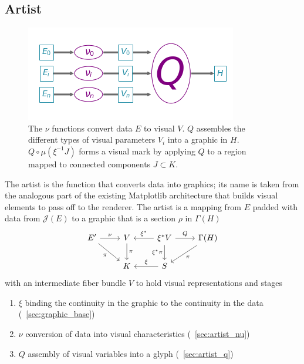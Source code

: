 \documentclass[../main.tex]{subfiles}
\begin{document}
\subsection{Artist}
\label{sec:artist}
\begin{figure}[H]
    \includegraphics[width=\textwidth]{figures/math/path_of_q}

    \caption{The $\nu$ functions convert data $E$ to visual $V$. $Q$ assembles the different types of visual parameters $V_{i}$ into a graphic in $H$. $Q\circ\mu(\xi^{-1}J)$ forms a visual mark by applying $Q$ to a region mapped to connected components $J \subset K$. } 
    \label{fig:artist_q}
\end{figure}

The artist is the function that converts data into graphics; its name is taken from the analogous part of the existing Matplotlib architecture that builds visual elements to pass off to the renderer. The artist is a mapping from $E$ padded with data from $\mathcal{J}(E)$ to a graphic that is a section $\rho$ in  $\Gamma(H)$
\begin{equation}
    \label{eq:artist_diagram}
    \begin{tikzcd}
        E' \arrow[r, "\nu"] \arrow[rd, "\pi"'] & V \arrow[d, "\pi"] & \xi^*V \arrow[r, "Q"] \arrow[d, "\xi^*\pi"'] \arrow[l, "\xi^*"'] & \Gamma(H) \arrow[ld, "\pi"] \\
                                              & K                  & S \arrow[l, "\xi"']                                              &                    
        \end{tikzcd}
\end{equation}
with an intermediate fiber bundle $V$ to hold visual representations and stages
\begin{enumerate}
    \item $\xi$ binding the continuity in the graphic to the continuity in the data (~\ref{sec:graphic_base})
    \item $\nu$ conversion of data into visual characteristics (~\ref{sec:artist_nu})
    \item $Q$ assembly of visual variables into a glyph (~\ref{sec:artist_q})
\end{enumerate}
 
\end{document}
